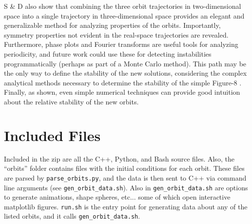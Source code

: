 \documentclass[12pt]{article}
\begin{document}
S \& D also show that combining the three orbit trajectories in two-dimensional space into a single trajectory in three-dimensional space provides an elegant and generalizable method for analyzing properties of the orbits. Importantly, symmetry properties not evident in the real-space trajectories are revealed. \\

Furthermore, phase plots and Fourier transforms are useful tools for analyzing periodicity, and future work could use these for detecting instabilities programmatically (perhaps as part of a Monte Carlo method). This path may be the only way to define the stability of the new solutions, considering the complex analytical methods necessary to determine the stability of the simple Figure-8 \cite{fig8}. Finally, as shown, even simple numerical techniques can provide good intuition about the relative stability of the new orbits.
\section{Included Files}
\label{if}
Included in the zip are all the C++, Python, and Bash source files. Also, the ``orbits'' folder contains files with the initial conditions for each orbit. These files are parsed by \texttt{parse\_orbits.py}, and the data is then sent to C++ via command line arguments (see \texttt{gen\_orbit\_data.sh}). Also in \texttt{gen\_orbit\_data.sh} are options to generate animations, shape spheres, etc... some of which open interactive matplotlib figures. \texttt{run.sh} is the entry point for generating data about any of the listed orbits, and it calls \texttt{gen\_orbit\_data.sh}.
\end{document}
